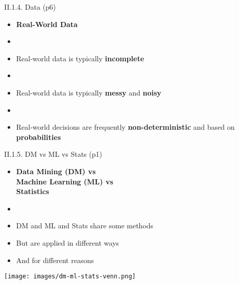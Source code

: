 \documentclass[handout]{beamer}
\newcommand{\strong}[1]{\textbf{\color{teal} #1}}
\newcommand{\stronger}[1]{\textbf{\color{purple} #1}}
\begin{document}
\begin{frame}{II.1.4. Data (p6)}
\begin{itemize}
\item[] \stronger{Real-World Data}
\item[]
\item Real-world data is typically \stronger{incomplete}
\item[]
\item Real-world data is typically \stronger{messy} and \stronger{noisy}
\item[]
\item Real-world decisions are frequently \stronger{non-deterministic} and based on \strong{probabilities}
\end{itemize}
\end{frame}
\begin{frame}{II.1.5. DM vs ML vs Stats (p1)}
\begin{itemize}
\item[] \strong{Data Mining (DM) vs\\ Machine Learning (ML) vs \\Statistics}
\item[]
\item DM and ML and Stats share some methods
\item But are applied in different ways
\item And for different reasons
\end{itemize}
\vspace{-0.1cm}
\begin{center}
\texttt{[image: images/dm-ml-stats-venn.png]}
\end{center}
\end{frame}
\end{document}
